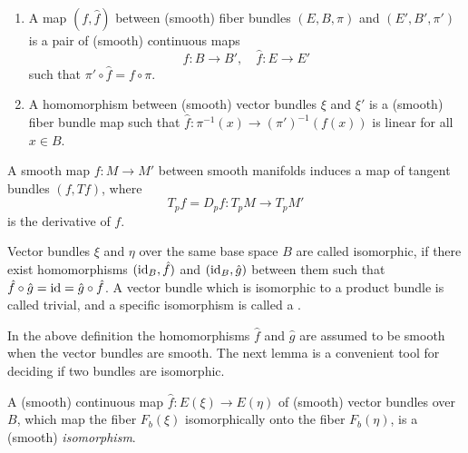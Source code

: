 \begin{definition}\label{definition:15-7}
  \begin{enumerate}
    \item A map $(f, \hat f)$ between (smooth) fiber bundles $(E, B, \pi)$ and $(E', B', \pi')$
      is a pair of (smooth) continuous maps
      \[
        f:B\to B',\quad \hat f:E\to E'
      \]
      such that $\pi'\circ \hat f=f\circ \pi$.
    \item A homomorphism between (smooth) vector bundles $\xi$ and $\xi'$ is a (smooth)
      fiber bundle map such that $\hat f:\pi^{-1}(x)\to(\pi')^{-1}(f(x))$ is linear for all 
      $x\in B$.
  \end{enumerate}
\end{definition}

\begin{example}\label{example:15-8}
  A smooth map $f: M\to M'$ between smooth manifolds induces a map of tangent bundles $(f, Tf)$, where
  \[
    T_pf = D_pf:T_pM\to T_pM'
  \]
  is the derivative of $f$.
\end{example}

\begin{definition}\label{definition:15-9}
  Vector bundles $\xi$ and $\eta$ over the same base space $B$ are called
  isomorphic, if there exist homomorphisms $(\operatorname{id}_B, \hat f)$ and $(\operatorname{id}_B, \hat g)$ between them
  such that $\hat f\circ\hat g=\operatorname{id} = \hat g\circ\hat f$. A vector bundle which is isomorphic to a product
  bundle is called trivial, and a specific isomorphism is called a .
\end{definition}

In the above definition the homomorphisms $\hat f$ and $\hat g$ are assumed to be smooth
when the vector bundles are smooth. The next lemma is a convenient tool for
deciding if two bundles are isomorphic.

\begin{lemma}\label{lemma:15-10}
  A (smooth) continuous map $\hat f:E(\xi)\to E(\eta)$ of (smooth) vector
  bundles over $B$, which map the fiber $F_b(\xi)$ isomorphically onto the fiber $F_b(\eta)$, is
  a (smooth) \textit{isomorphism}.
\end{lemma}

